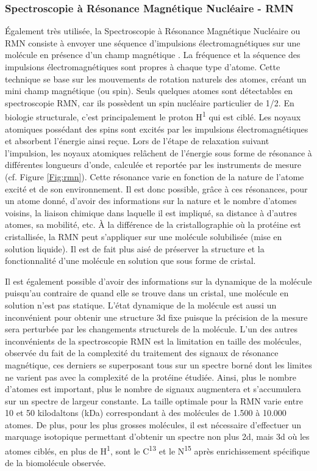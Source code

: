 \subsubsection{Spectroscopie à Résonance Magnétique Nucléaire - RMN}

Également très utilisée, la Spectroscopie à Résonance Magnétique Nucléaire ou RMN consiste à envoyer une séquence d'impulsions électromagnétiques sur une molécule en présence d'un champ magnétique \cite{wuthrich1986nmr}. La fréquence et la séquence des impulsions électromagnétiques sont propres à chaque type d'atome. Cette technique se base sur les mouvements de rotation naturels des atomes, créant un mini champ magnétique (ou spin). Seuls quelques atomes sont détectables en spectroscopie RMN, car ils possèdent un spin nucléaire particulier de 1/2. En biologie structurale, c'est principalement le proton H\textsuperscript{1} qui est ciblé. Les noyaux atomiques possédant des spins sont excités par les impulsions électromagnétiques et absorbent l'énergie ainsi reçue. Lors de l'étape de relaxation suivant l'impulsion, les noyaux atomiques relâchent de l'énergie sous forme de résonance à différentes longueurs d'onde, calculée et reportée par les instruments de mesure (cf. Figure \ref{Fig:rmn}). Cette résonance varie en fonction de la nature de l'atome excité et de son environnement. Il est donc possible, grâce à ces résonances, pour un atome donné, d'avoir des informations sur la nature et le nombre d'atomes voisins, la liaison chimique dans laquelle il est impliqué, sa distance à d'autres atomes, sa mobilité, etc. À la différence de la cristallographie où la protéine est cristallisée, la RMN peut s'appliquer sur une molécule solubilisée (mise en solution liquide). Il est de fait plus aisé de préserver la structure et la fonctionnalité d'une molécule en solution que sous forme de cristal. 

Il est également possible d'avoir des informations sur la dynamique de la molécule puisqu'au contraire de quand elle se trouve dans un cristal, une molécule en solution n'est pas statique.
L'état dynamique de la molécule est aussi un inconvénient pour obtenir une structure 3d fixe puisque la précision de la mesure sera perturbée par les changements structurels de la molécule. L'un des autres inconvénients de la spectroscopie RMN est la limitation en taille des molécules, observée du fait de la complexité du traitement des signaux de résonance magnétique, ces derniers se superposant tous sur un spectre borné dont les limites ne varient pas avec la complexité de la protéine étudiée. Ainsi, plus le nombre d'atomes est important, plus le nombre de signaux augmentera et s'accumulera sur un spectre de largeur constante. La taille optimale pour la RMN varie entre 10 et 50 kilodaltons (kDa) correspondant à des molécules de 1.500 à 10.000 atomes. De plus, pour les plus grosses molécules, il est nécessaire d'effectuer un marquage isotopique permettant d'obtenir un spectre non plus 2d, mais 3d où les atomes ciblés, en plus de H\textsuperscript{1}, sont le C\textsuperscript{13} et le N\textsuperscript{15} après enrichissement spécifique de la biomolécule observée.

